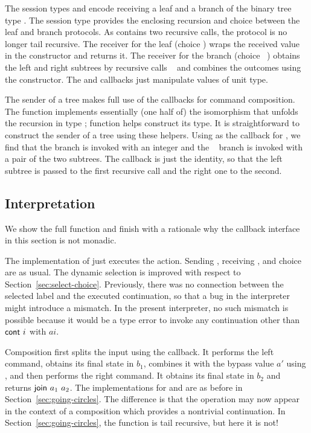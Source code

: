 \documentclass[acmsmall,screen]{acmart}
\begin{document}
The session types {\Aleafp} and {\Abranchp} encode receiving a leaf and
a branch of the binary tree type {\AIntTree}. The session type
{\Atreep} provides the enclosing recursion and choice between the leaf
and branch protocols. As {\Abranchp} contains two recursive calls,
the protocol {\Atreep} is no longer tail recursive.
\cstRecvTree
The receiver for the leaf (choice {\Azero}) wraps the received value in the {\ACLeaf}
constructor and returns it.
The receiver for the branch (choice {\Asuc~\Azero}) obtains the left and right subtrees by
recursive calls {\ACONTINUE~\Azero} and combines the outcomes using
the {\ACBranch} constructor. The {\Asplit} and {\Across} callbacks
just manipulate values of unit type.

The sender of a tree makes full use of the callbacks for command
composition. 
\cstSendTree
The function {\AsplitTree} implements essentially (one half of) the
isomorphism that unfolds the recursion in type {\AIntTree};
function {\AIntTreeF} helps construct its type. It is straightforward
to construct the sender of a tree using these helpers. Using
{\AsplitTree} as the callback for {\ACSELECT}, we find that the
{\Azero} branch is invoked with an integer and the {\Asuc~\Azero}
branch is invoked with a pair of the two subtrees. The {\Asplit}
callback is just the identity, so that the left subtree is passed to
the first recursive call and the right one to the second.

\subsection{Interpretation}
\label{sec:interpretation}


We show the full {\Aexecutor} function and finish with a rationale why
the callback interface in this section is not monadic.
\cstExec

The implementation of {\ACSKIP} just executes the action.
Sending  {\ACSEND}, receiving  {\ACRECV}, and choice {\ACCHOICE} are as usual.
The dynamic selection is improved with respect to
Section~\ref{sec:select-choice}. Previously, there was no connection
between the selected label and the executed continuation, so that a
bug in the interpreter might introduce a mismatch. In the present
interpreter, no such mismatch is possible because it would be a type
error to invoke any continuation other than $\Acont~i$ with $ai$.

Composition first splits the input using the {\Asplit} callback. It performs the left command, obtains its final state in
$b_1$, combines it with the bypass value $a'$ using {\Across}, and
then performs the right command. It obtains its final state in
$b_2$ and returns $\Ajoin~a_1~a_2$.
The implementations for {\AMU} and {\ACONTINUE} are as before in
Section~\ref{sec:going-circles}. The difference is that the
{\ACONTINUE} operation may now appear in the context of a composition
which provides a nontrivial continuation. In
Section~\ref{sec:going-circles}, the function {\Aexecutor} is tail
recursive, but here it is not!
\end{document}
